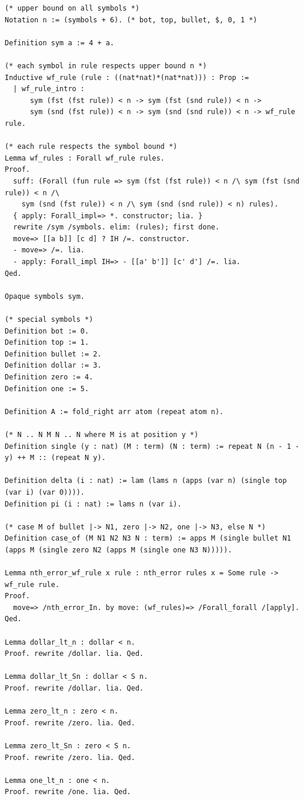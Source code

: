\begin{lstlisting}
(* upper bound on all symbols *)
Notation n := (symbols + 6). (* bot, top, bullet, $, 0, 1 *)

Definition sym a := 4 + a.

(* each symbol in rule respects upper bound n *)
Inductive wf_rule (rule : ((nat*nat)*(nat*nat))) : Prop :=
  | wf_rule_intro : 
      sym (fst (fst rule)) < n -> sym (fst (snd rule)) < n ->
      sym (snd (fst rule)) < n -> sym (snd (snd rule)) < n -> wf_rule rule.

(* each rule respects the symbol bound *)
Lemma wf_rules : Forall wf_rule rules.
Proof.
  suff: (Forall (fun rule => sym (fst (fst rule)) < n /\ sym (fst (snd rule)) < n /\
    sym (snd (fst rule)) < n /\ sym (snd (snd rule)) < n) rules).
  { apply: Forall_impl=> *. constructor; lia. }
  rewrite /sym /symbols. elim: (rules); first done.
  move=> [[a b]] [c d] ? IH /=. constructor.
  - move=> /=. lia.
  - apply: Forall_impl IH=> - [[a' b']] [c' d'] /=. lia.
Qed.

Opaque symbols sym.

(* special symbols *)
Definition bot := 0.
Definition top := 1.
Definition bullet := 2.
Definition dollar := 3.
Definition zero := 4.
Definition one := 5.

Definition A := fold_right arr atom (repeat atom n).

(* N .. N M N .. N where M is at position y *)
Definition single (y : nat) (M : term) (N : term) := repeat N (n - 1 - y) ++ M :: (repeat N y).

Definition delta (i : nat) := lam (lams n (apps (var n) (single top (var i) (var 0)))).
Definition pi (i : nat) := lams n (var i).

(* case M of bullet |-> N1, zero |-> N2, one |-> N3, else N *)
Definition case_of (M N1 N2 N3 N : term) := apps M (single bullet N1 (apps M (single zero N2 (apps M (single one N3 N))))).

Lemma nth_error_wf_rule x rule : nth_error rules x = Some rule -> wf_rule rule.
Proof.
  move=> /nth_error_In. by move: (wf_rules)=> /Forall_forall /[apply].
Qed.

Lemma dollar_lt_n : dollar < n.
Proof. rewrite /dollar. lia. Qed.

Lemma dollar_lt_Sn : dollar < S n.
Proof. rewrite /dollar. lia. Qed.

Lemma zero_lt_n : zero < n.
Proof. rewrite /zero. lia. Qed.

Lemma zero_lt_Sn : zero < S n.
Proof. rewrite /zero. lia. Qed.

Lemma one_lt_n : one < n.
Proof. rewrite /one. lia. Qed.


\end{lstlisting}
